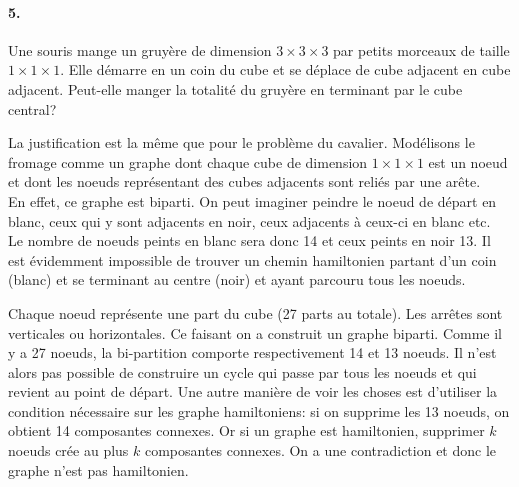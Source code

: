 \paragraph{5. } Une souris mange un gruyère de dimension $3 \times 3 \times 3$ par petits morceaux de taille $1 \times 1 \times 1$. Elle démarre en un coin du cube et se déplace de cube adjacent en cube adjacent. Peut-elle manger la totalité du gruyère en terminant par le cube central?
\begin{solution}
La justification est la même que pour le problème du cavalier. Modélisons le fromage comme un graphe dont chaque cube de dimension $1 \times 1 \times 1$ est un noeud et dont les noeuds représentant des cubes adjacents sont reliés par une arête.\\
En effet, ce graphe est biparti. On peut imaginer peindre le noeud de départ en blanc, ceux qui y sont adjacents en noir, ceux adjacents à ceux-ci en blanc etc.\\
Le nombre de noeuds peints en blanc sera donc 14 et ceux peints en noir 13. Il est évidemment impossible de trouver un chemin hamiltonien partant d'un coin (blanc) et se terminant au centre (noir) et ayant parcouru tous les noeuds.
\end{solution}

\begin{solution}
Chaque noeud représente une part du cube (27 parts au totale). Les arrêtes sont verticales ou horizontales. Ce faisant on a construit un graphe biparti. Comme il y a 27 noeuds, la bi-partition comporte respectivement 14 et 13 noeuds. Il n'est alors pas possible de construire un cycle qui passe par tous les noeuds et qui revient au point de départ. Une autre manière de voir les choses est d'utiliser la condition nécessaire sur les graphe hamiltoniens: si on supprime les 13 noeuds, on obtient 14 composantes connexes. Or si un graphe est hamiltonien, supprimer $k$ noeuds crée au plus $k$ composantes connexes. On a une contradiction et donc le graphe n'est pas hamiltonien.
\end{solution}

